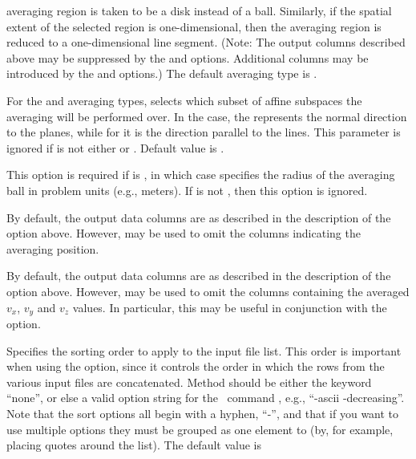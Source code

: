 \begin{description}
  averaging region is taken to be a disk instead of a ball.
  Similarly, if the spatial extent of the selected region is
  one-dimensional, then the averaging region is reduced to a
  one-dimensional line segment.  (Note: The output columns described
  above may be suppressed by the  and
   options.  Additional columns may be introduced by
  the  and  options.)  The default averaging
  type is .
\item[\optkey{-axis \boa x\pipe y\pipe z\bca}]
  For the  and  averaging types,
  selects which subset of affine subspaces the averaging will be
  performed over.  In the  case, the  represents
  the normal direction to the planes, while for  it is the
  direction parallel to the lines.  This parameter is ignored if
   is not either  or .  Default value
  is .
\item[\optkey{-ball\_radius brad}]
  This option is required if  is , in which case
   specifies the radius of the averaging ball in problem
  units (e.g., meters).  If   is not , then this
  option is ignored.
\item[\optkey{-defaultpos \boa 0\pipe 1\bca}]
  By default, the output data columns are as described in the
  description of the  option above.  However,
   may be used to omit the columns indicating the
  averaging position.
\item[\optkey{-defaultvals \boa 0\pipe 1\bca}]
  By default, the output data columns are as described in the
  description of the  option above.  However,
   may be used to omit the columns containing the
  averaged $v_x$, $v_y$ and $v_z$ values.  In particular, this may be
  useful in conjunction with the  option.
\item[\optkey{-filesort method}]
  Specifies the sorting order to apply to the input file list.  This
  order is important when using the  option, since it
  controls the order in which the rows from the various input files
  are concatenated.  Method should be either the keyword ``none'', or
  else a valid option string for the \Tcl\ command , e.g.,
  ``-ascii -decreasing''.  Note that the  sort options all
  begin with a hyphen, ``-'', and that if you want to use multiple
  options they must be grouped as one element to  (by,
  for example, placing quotes around the list).  The default value is

\end{description}
